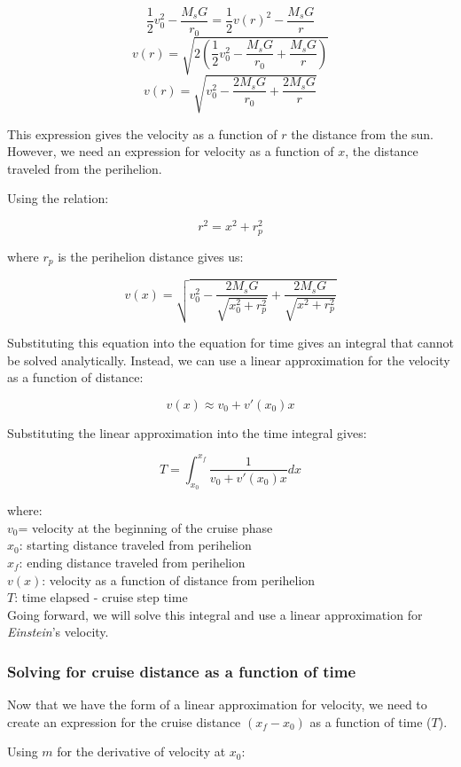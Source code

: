 \documentclass[12pt]{article} %
\begin{document}
$$\frac{1}{2}v_0^2-\frac{M_sG}{r_0} = \frac{1}{2}v(r)^2-\frac{M_sG}{r}$$
$$v(r) = \sqrt{2  (\frac{1}{2}v_0^2-\frac{M_sG}{r_0} + \frac{M_sG}{r})}$$
$$v(r) = \sqrt{v_0^2-\frac{2M_sG}{r_0} + \frac{2M_sG}{r}}$$

This expression gives the velocity as a function of $r$ the distance from the sun. However, we need an expression for velocity as a function of $x$, the distance traveled from the perihelion. 

Using the relation:

$$r^2 = x^2 + r_p^2$$

where $r_p$ is the perihelion distance gives us:

$$v(x) = \sqrt{v_0^2-\frac{2M_sG}{\sqrt{x_0^2 + r_p^2}} + \frac{2M_sG}{\sqrt{x^2 + r_p^2}}}$$

Substituting this equation into the equation for time gives an integral that cannot be solved analytically. Instead, we can use a linear approximation for the velocity as a function of distance:

$$v(x) \approx v_0 + v'(x_0)x$$

Substituting the linear approximation into the time integral gives:

$$\boxed{T = \int_{x_0}^{x_f} \frac{1}{v_0+v'(x_0)x} dx}$$

where:\\
$v_0$= velocity at the beginning of the cruise phase\\
$x_0$: starting distance traveled from perihelion\\
$x_f$: ending distance traveled from perihelion\\
$v(x)$: velocity as a function of distance from perihelion\\
$T$: time elapsed - cruise step time\\

Going forward, we will solve this integral and use a linear approximation for \textit{Einstein}'s velocity.

\subsubsection{Solving for cruise distance as a function of time}

Now that we have the form of a linear approximation for velocity, we need to create an expression for the cruise distance $(x_f-x_0)$ as a function of time ($T$).

Using $m$ for the derivative of velocity at $x_0$:
\end{document}
